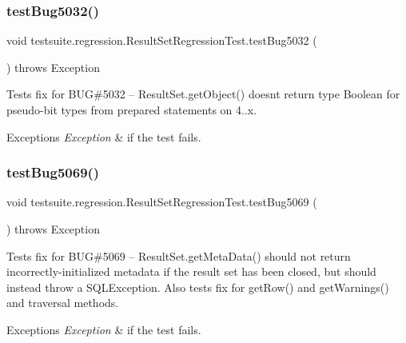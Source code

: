 \subsubsection{\texorpdfstring{test\+Bug5032()}{testBug5032()}}
{\footnotesize\ttfamily void testsuite.\+regression.\+Result\+Set\+Regression\+Test.\+test\+Bug5032 (\begin{DoxyParamCaption}{ }\end{DoxyParamCaption}) throws Exception}

Tests fix for B\+UG\#5032 -- Result\+Set.\+get\+Object() doesn\textquotesingle{}t return type Boolean for pseudo-\/bit types from prepared statements on 4..\+x.


\begin{DoxyExceptions}{Exceptions}
{\em Exception} & if the test fails. \\
\hline
\end{DoxyExceptions}
\mbox{\label{classtestsuite_1_1regression_1_1_result_set_regression_test_a3fc2285158514cb2ab7dcc1e3880113b}} 
\subsubsection{\texorpdfstring{test\+Bug5069()}{testBug5069()}}
{\footnotesize\ttfamily void testsuite.\+regression.\+Result\+Set\+Regression\+Test.\+test\+Bug5069 (\begin{DoxyParamCaption}{ }\end{DoxyParamCaption}) throws Exception}

Tests fix for B\+UG\#5069 -- Result\+Set.\+get\+Meta\+Data() should not return incorrectly-\/initialized metadata if the result set has been closed, but should instead throw a S\+Q\+L\+Exception. Also tests fix for get\+Row() and get\+Warnings() and traversal methods.


\begin{DoxyExceptions}{Exceptions}
{\em Exception} & if the test fails. \\
\hline
\end{DoxyExceptions}
\mbox{\label{classtestsuite_1_1regression_1_1_result_set_regression_test_a9f4b082f0411dbf1f533998671d080cd}} 
